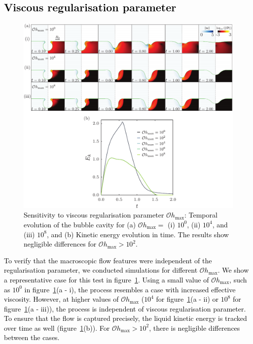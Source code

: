 \documentclass[final]{jfm}
\newcommand*\red{\textcolor{black}}
\begin{document}
\subsection{\red{Viscous regularisation parameter}}\label{App::OhMax}
\begin{figure}
	\centerline{\includegraphics[width=\linewidth]{Figures/FigureE1-eps-converted-to.pdf}}%
	\caption{\red{Sensitivity to viscous regularisation parameter $\mathcal{O}h_{\text{max}}$: Temporal evolution of the bubble cavity for (a) $\mathcal{O}h_{\text{max}} =$ (i) $10^0$, (ii) $10^4$, and (iii) $10^8$, and (b) Kinetic energy evolution in time. The results show negligible differences for $\mathcal{O}h_{\text{max}} > 10^2$.}}
	\label{fig:OhMax}
\end{figure}
\red{To verify that the macroscopic flow features were independent of the regularisation parameter, we conducted simulations for different $\mathcal{O}h_\text{max}$. We show a representative case for this test in figure~\ref{fig:OhMax}. Using a small value of $\mathcal{O}h_\text{max}$, such as $10^0$ in figure~\ref{fig:OhMax}(a - i), the process resembles a case with increased effective viscosity. However, at higher values of $\mathcal{O}h_\text{max}$ ($10^4$ for figure~\ref{fig:OhMax}(a - ii) or $10^8$ for figure~\ref{fig:OhMax}(a - iii)), the process is independent of viscous regularisation parameter. To ensure that the flow is captured precisely, the liquid kinetic energy is tracked over time as well (figure~\ref{fig:OhMax}(b)). For $\mathcal{O}h_{\text{max}} > 10^2$, there is negligible differences between the cases. }
\end{document}
